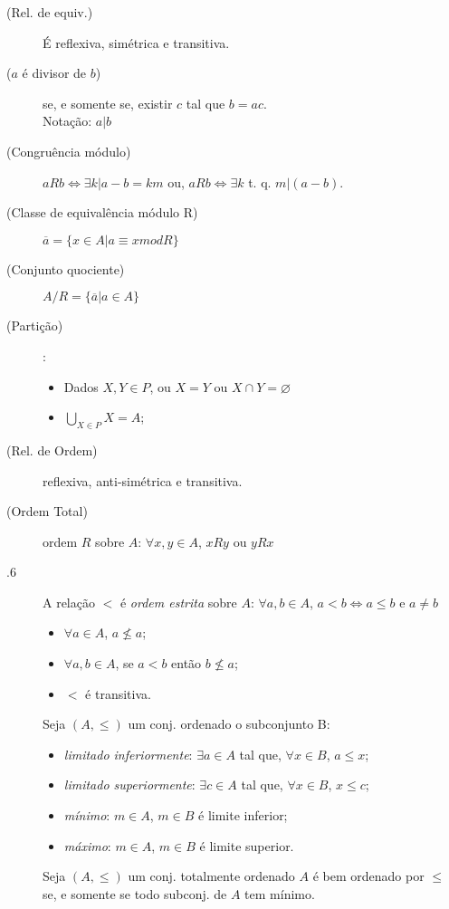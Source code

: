 \documentclass[11pt]{article}
\begin{document}
\begin{description}
  \item[ (Rel. de equiv.)] É reflexiva, simétrica e transitiva.
  \item[ ($a$ é divisor de $b$)] se, e somente se, existir $c$ tal que $b = ac$.  \\
    Notação: $a|b$
  \item[ (Congruência módulo)]
    $aRb \iff \exists k | a-b=km$ ou,
    $aRb \iff \exists k$ t. q. $m|(a-b)$.

  \item[ (Classe de equivalência módulo R)] $\overline{a} = \{ x \in A | a
    \equiv x mod R\}$
  \item[ (Conjunto quociente)] $A/R = \{ \overline{a} | a \in A \}$
  \item[ (Partição)]:
    \begin{itemize}
      \item Dados $X, Y \in P$, ou $X=Y$ ou $X\cap Y= \varnothing$
      \item $\bigcup\limits_{X \in P}X = A$;
    \end{itemize}
\end{description}


\begin{description}
  \item[ (Rel. de Ordem)] reflexiva, anti-simétrica e transitiva.
  \item[ (Ordem Total)] ordem $R$ sobre $A$:
    $\forall x,y \in A$, $xRy$ ou $yRx$
  \item[.6] A relação $<$ é \emph{ordem estrita} sobre $A$:
    $\forall a,b \in A$, $a < b \iff a \leq b$ e $a\neq b$

    \begin{itemize}
      \item $\forall a \in A$, $a \nleq a$;
      \item $\forall a,b \in A$, se $a<b$ então $b\nleq a$;
      \item $<$ é transitiva.
    \end{itemize}
  \item[] Seja $(A, \le)$ um conj. ordenado o subconjunto B:
    \begin{itemize}
      \item \emph{limitado inferiormente}: $\exists a \in A$ tal que, $\forall x
        \in B$, $a \leq x$;
      \item \emph{limitado superiormente}: $\exists c \in A$ tal que, $\forall x
        \in B$, $x \leq c$;
      \item \emph{mínimo}: $m \in A$, $m \in B$ é limite inferior;
      \item \emph{máximo}: $m \in A$, $m \in B$ é limite superior.
    \end{itemize}

  \item[] Seja $(A, \leq)$ um conj. totalmente ordenado $A$ é bem
    ordenado por $\leq$ se, e somente se todo subconj. de $A$ tem mínimo.
\end{description}
\end{document}
